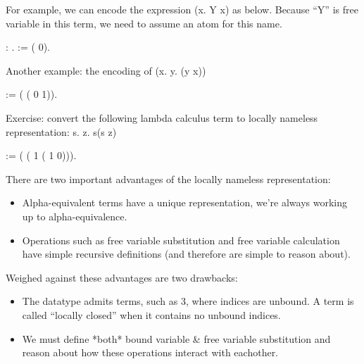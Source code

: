 \documentclass[12pt]{report}
\begin{document}
For example, we can encode the expression (x. Y x) as below.
    Because ``Y'' is free variable in this term, we need to assume an atom 
    for this name.
 \begin{coqdoccode}
\coqdocemptyline
\coqdocnoindent
{}  : .\coqdoceol
\coqdocnoindent
{}  :=  (  0).\coqdoceol
\coqdocemptyline
\end{coqdoccode}
Another example: the encoding of (x. y. (y x)) \begin{coqdoccode}
\coqdocemptyline
\coqdocnoindent
{}  :=  ( ( 0 1)).\coqdoceol
\coqdocemptyline
\end{coqdoccode}
Exercise: convert the following lambda calculus term to locally 
    nameless representation: s. z. s(s z) \begin{coqdoccode}
\coqdocemptyline
\coqdocnoindent
{}  :=  ( ( 1 ( 1 0))).\coqdoceol
\coqdocemptyline
\end{coqdoccode}
There are two important advantages of the locally nameless
    representation:

\begin{itemize}
\item  Alpha-equivalent terms have a unique representation, 
       we're always working up to alpha-equivalence.

\item  Operations such as free variable substitution and free
       variable calculation have simple recursive definitions
      (and therefore are simple to reason about).

\end{itemize}


    Weighed against these advantages are two drawbacks:

\begin{itemize}
\item  The  datatype admits terms, such as  3, where
       indices are unbound. 
       A term is called ``locally closed'' when it contains 
       no unbound indices. 

\item  We must define *both* bound variable \& free variable 
       substitution and reason about how these operations 
       interact with eachother.

\end{itemize}
\end{document}
